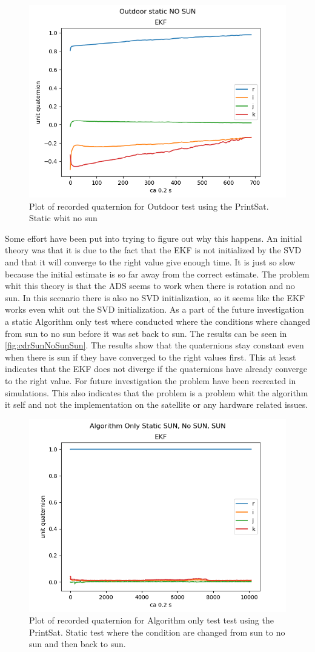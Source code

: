 \begin{figure}[tbp]
	\centering
	\includegraphics[width=0.6\columnwidth]{./Pictures/run3OutdoorStaticNOSUN}
	\caption{Plot of recorded quaternion for Outdoor test using the PrintSat. Static whit  no sun}
	\label{fig:OutdoorNoRotationNoSun}
\end{figure}         

Some effort have been put into trying to figure out why this happens. An initial theory was that it is due to the fact that the EKF is not initialized by the SVD and that it will converge to the right value give enough time. It is just so slow because the initial estimate is so far away from the correct estimate. The problem whit this theory is that the ADS seems to work when there is rotation and no sun. In this scenario there is also no SVD initialization, so it seems like the EKF works even whit out the SVD initialization. As a part of the future investigation a static Algorithm only test where conducted where the conditions where changed from sun to no sun before it was set back to sun. The results can be seen in \autoref{fig:cdrSunNoSunSun}. The results show that the quaternions stay constant even when there is sun if they have converged to the right values first. This at least indicates that the EKF does not diverge if the quaternions have already converge to the right value. For future investigation the problem have been recreated in simulations. This also indicates that the problem is a problem whit the algorithm it self and not the implementation on the satellite or any hardware related issues. 

\begin{figure}[tbp]
	\centering
	\includegraphics[width=0.6\columnwidth]{./Pictures/cdrRun1StaticSunEclipsSun}
	\caption{Plot of recorded quaternion for Algorithm only test test using the PrintSat. Static test where the condition are changed from sun to no sun and then back to sun. }
	\label{fig:cdrSunNoSunSun}
\end{figure} 

